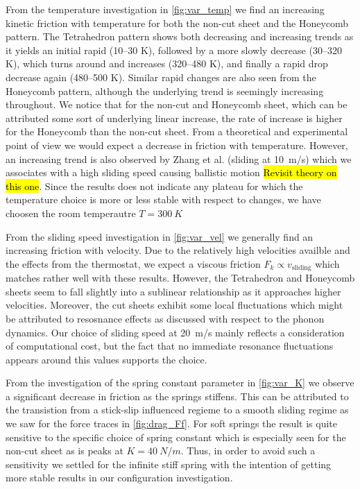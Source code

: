 From the temperature investigation in \cref{fig:var_temp} we find an increasing
kinetic friction with temperature for both the non-cut sheet and the Honeycomb
pattern. The Tetrahedron pattern shows both decreasing and increasing trends as
it yields an initial rapid (10--30 K), followed by a more slowly decrease
(30--320 K), which turns around and increases (320--480 K), and finally a rapid
drop decrease again (480--500 K). Similar rapid changes are also seen from the
Honeycomb pattern, although the underlying trend is seemingly increasing
throughout. We notice that for the non-cut and Honeycomb sheet, which can be
attributed some sort of underlying linear increase, the rate of increase is
higher for the Honeycomb than the non-cut sheet. From a theoretical and
experimental point of view we would expect a decrease in friction with
temperature. However, an increasing trend is also observed by Zhang et al.
\cite{ma12091425} (sliding at \SI{10}{m/s}) which we associates with a high
sliding speed causing ballistic motion \hl{Revisit theory on this one}. Since
the results does not indicate any plateau for which the temperature choice is
more or less stable with respect to changes, we have choosen the room
temperautre $T = \SI{300}{K}$ 


From the sliding speed investigation in \cref{fig:var_vel} we generally find an increasing friction with velocity. Due to the relatively high velocities availble and the effects from the thermostat, we expect a viscous friction $F_k \propto v_{\text{sliding}}$ which matches rather well with these results. However, the Tetrahedron and Honeycomb sheets seem to fall slightly into a sublinear relationship as it approaches higher velocities. Moreover, the cut sheets exhibit some local fluctuations which might be attributed to resosnance effects as discussed with respect to the phonon dynamics. Our choice of sliding speed at \SI{20}{m/s} mainly reflects a consideration of computational cost, but the fact that no immediate resonance fluctuations appears around this values supports the choice.  

From the investigation of the spring constant parameter in \cref{fig:var_K} we observe a significant decrease in friction as the springs stiffens. This can be attributed to the transistion from a stick-slip influenced regieme to a smooth sliding regime as we saw for the force traces in \cref{fig:drag_Ff}. For soft springs the result is quite sensitive to the specific choice of spring constant which is especially seen for the non-cut sheet as is peaks at $K = \SI{40}{N/m}$. Thus, in order to avoid such a sensitivity we settled for the infinite stiff spring with the intention of getting more stable results in our configuration investigation.


